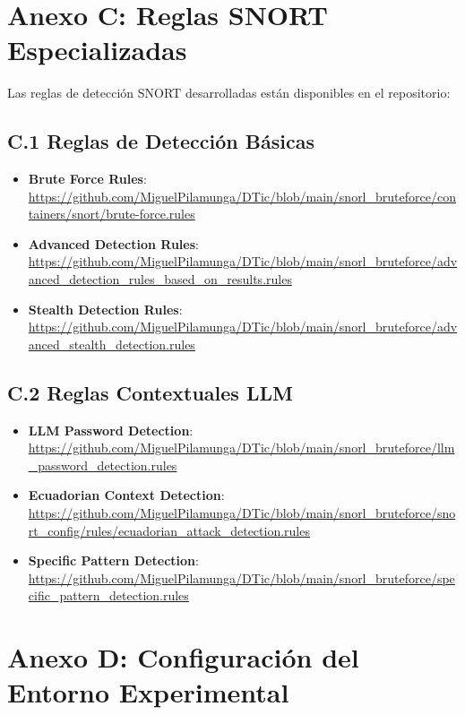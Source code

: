 \section*{Anexo C: Reglas SNORT Especializadas}

Las reglas de detección SNORT desarrolladas están disponibles en el repositorio:

\subsection*{C.1 Reglas de Detección Básicas}
\begin{itemize}
    \item \textbf{Brute Force Rules}: \url{https://github.com/MiguelPilamunga/DTic/blob/main/snorl_bruteforce/containers/snort/brute-force.rules}
    \item \textbf{Advanced Detection Rules}: \url{https://github.com/MiguelPilamunga/DTic/blob/main/snorl_bruteforce/advanced_detection_rules_based_on_results.rules}
    \item \textbf{Stealth Detection Rules}: \url{https://github.com/MiguelPilamunga/DTic/blob/main/snorl_bruteforce/advanced_stealth_detection.rules}
\end{itemize}

\subsection*{C.2 Reglas Contextuales LLM}
\begin{itemize}
    \item \textbf{LLM Password Detection}: \url{https://github.com/MiguelPilamunga/DTic/blob/main/snorl_bruteforce/llm_password_detection.rules}
    \item \textbf{Ecuadorian Context Detection}: \url{https://github.com/MiguelPilamunga/DTic/blob/main/snorl_bruteforce/snort_config/rules/ecuadorian_attack_detection.rules}
    \item \textbf{Specific Pattern Detection}: \url{https://github.com/MiguelPilamunga/DTic/blob/main/snorl_bruteforce/specific_pattern_detection.rules}
\end{itemize}

\section*{Anexo D: Configuración del Entorno Experimental}

